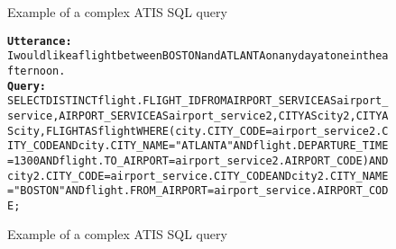 \begin{figure}[H]
    \label{tab:ATIS}
    \begin{AIbox}{Example of a complex ATIS SQL query}
        \vspace{-5px}
        \parbox{1\textwidth}{\scriptsize
        \begin{alltt} \larger
            {\bf Utterance:} \\ 
            I would like a flight between BOSTON and ATLANTA on any day at one in the afternoon. 
            \\
            {\bf Query:} \\
            SELECT DISTINCT flight.FLIGHT\_ID FROM AIRPORT\_SERVICE AS airport\_service , AIRPORT\_SERVICE AS airport\_service2 , CITY AS city2 , CITY AS city , FLIGHT AS flight WHERE ( city.CITY\_CODE = airport\_service2.CITY\_CODE AND city.CITY\_NAME = "ATLANTA" AND flight.DEPARTURE\_TIME = 1300 AND flight.TO\_AIRPORT = airport\_service2.AIRPORT\_CODE ) AND city2.CITY\_CODE = airport\_service.CITY\_CODE AND city2.CITY\_NAME = "BOSTON" AND flight.FROM\_AIRPORT = airport\_service.AIRPORT\_CODE ;
        \end{alltt}
        }
        \vspace{-5px}
    \end{AIbox}
    \caption{Example of a complex ATIS SQL query}
\end{figure}